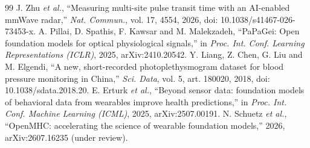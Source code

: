\documentclass[conference]{IEEEtran}
\begin{document}
\begin{thebibliography}{99}
 J. Zhu \emph{et al.}, ``Measuring multi-site pulse transit time with an AI-enabled mmWave radar,'' \emph{Nat. Commun.}, vol. 17, 4554, 2026, doi: 10.1038/s41467-026-73453-x.
 A. Pillai, D. Spathis, F. Kawsar and M. Malekzadeh, ``PaPaGei: Open foundation models for optical physiological signals,'' in \emph{Proc. Int. Conf. Learning Representations (ICLR)}, 2025, arXiv:2410.20542.
 Y. Liang, Z. Chen, G. Liu and M. Elgendi, ``A new, short-recorded photoplethysmogram dataset for blood pressure monitoring in China,'' \emph{Sci. Data}, vol. 5, art. 180020, 2018, doi: 10.1038/sdata.2018.20.
 E. Erturk \emph{et al.}, ``Beyond sensor data: foundation models of behavioral data from wearables improve health predictions,'' in \emph{Proc. Int. Conf. Machine Learning (ICML)}, 2025, arXiv:2507.00191.
 N. Schuetz \emph{et al.}, ``OpenMHC: accelerating the science of wearable foundation models,'' 2026, arXiv:2607.16235 (under review).
\end{thebibliography}
\end{document}
